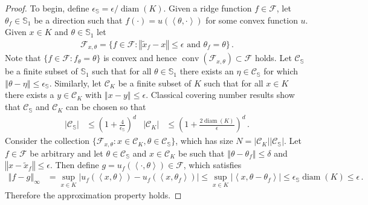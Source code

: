 \documentclass[letter, 12pt]{report}
\newcommand{\ip}[1]{\left \langle #1 \right \rangle}
\newcommand{\sphere}{\mathbb{S}}
\newcommand{\norm}[1]{\left \Vert  #1 \right \Vert}
\newcommand{\cC}{\mathcal C}
\newcommand{\sF}{\mathscr F}
\newcommand{\conv}{\operatorname{conv}}
\newcommand{\diam}{\operatorname{diam}}
\newcommand{\1}{\mathbf{1}}
\theoremstyle{plain}
\theoremstyle{definition}
\theoremstyle{remark}
\begin{document}
\begin{proof}
    To begin, define $\epsilon_{\mathbb S} = \epsilon/\diam(K)$.
    Given a ridge function $f \in \sF$, let $\theta_f \in \sphere_1$ be a direction such that $f(\cdot) = u(\ip{\theta, \cdot})$ for some convex function $u$.
    Given $x \in K$ and $\theta \in \sphere_1$ let
    \begin{align*}
        \sF_{x,\theta} = \{f \in \sF : \norm{\tilde x_f - x} \leq \epsilon \text{ and } \theta_f = \theta\} \,.
    \end{align*}
    Note that $\{f \in \sF : f_\theta = \theta\}$ is convex and hence $\conv(\sF_{x,\theta}) \subset \sF$ holds.
    Let $\cC_{\mathbb S}$ be a finite subset of $\sphere_1$ such that for all $\theta \in \sphere_1$ there exists an $\eta \in \cC_{\mathbb S}$
    for which $\norm{\theta - \eta} \leq \epsilon_{\mathbb S}$.
    Similarly, let $\cC_K$ be a finite subset of $K$ such that for all $x \in K$ there exists a $y \in \cC_K$ with $\norm{x - y} \leq \epsilon$.
    Classical covering number results \citep[\S4]{ASG15} show that $\cC_{\mathbb S}$ and $\cC_K$ can be chosen so that
    \begin{align*}
        |\cC_{\mathbb S}| & \leq \left(1 + \frac{4}{\epsilon_{\mathbb S}}\right)^d  &
        |\cC_K|           & \leq \left(1 + \frac{2 \diam(K)}{\epsilon}\right)^d \,.
    \end{align*}
    Consider the collection $\{\sF_{x,\theta} : x \in \cC_K, \theta \in \cC_{\mathbb S}\}$, which has size $N = |\cC_K| |\cC_{\mathbb S}|$.
    Let $f \in \sF$ be arbitrary and let $\theta \in \cC_{\mathbb S}$ and $x \in \cC_K$ be such that
    $\norm{\theta - \theta_f} \leq \delta$ and $\norm{x - \tilde x_f} \leq \epsilon$.
    Then define $g = u_f(\ip{\cdot, \theta}) \in \sF$, which satisfies
    \begin{align*}
        \norm{f - g}_\infty
         & = \sup_{x \in K} |u_f(\ip{x, \theta}) - u_f(\ip{x, \theta_f})|
        \leq \sup_{x \in K} |\ip{x, \theta - \theta_f}|
        \leq \epsilon_{\mathbb S} \diam(K)
        \leq \epsilon \,.
    \end{align*}
    Therefore the approximation property holds.
\end{proof}
\end{document}
